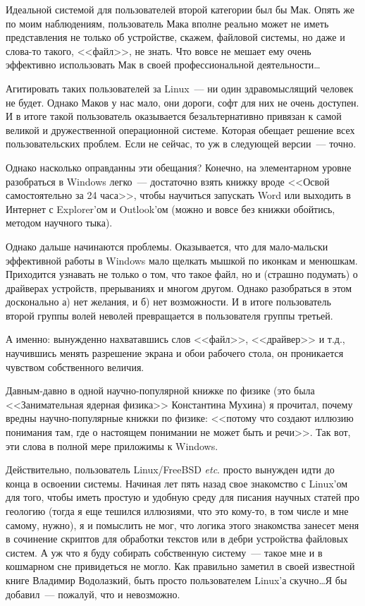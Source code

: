 Идеальной системой для пользователей второй категории был бы Мак. Опять же по моим наблюдениям, пользователь Мака вполне реально может не иметь представления не только об устройстве, скажем, файловой системы, но даже и слова-то такого, <<файл>>, не знать. Что вовсе не мешает ему очень эффективно использовать Мак в своей профессиональной деятельности\dots

Агитировать таких пользователей за Linux~--- ни один здравомыслящий человек не будет. Однако Маков у нас мало, они дороги, софт для них не очень доступен. И в итоге такой пользователь оказывается безальтернативно привязан к самой великой и дружественной операционной системе. Которая обещает решение всех пользовательских проблем. Если не сейчас, то уж в следующей версии~--- точно. 

Однако насколько оправданны эти обещания? Конечно, на элементарном уровне разобраться в Windows легко~--- достаточно взять книжку вроде <<Освой самостоятельно за 24 часа>>, чтобы научиться запускать Word или выходить в Интернет с Explorer'ом и Outlook'ом (можно и вовсе без книжки обойтись, методом научного тыка). 

Однако дальше начинаются проблемы. Оказывается, что для мало-мальски эффективной работы в Windows мало щелкать мышкой по иконкам и менюшкам. Приходится узнавать не только о том, что такое файл, но и (страшно подумать) о драйверах устройств, прерываниях и многом другом. Однако разобраться в этом досконально а) нет желания, и б) нет возможности. И в итоге пользователь второй группы волей неволей превращается в пользователя группы третьей.

А именно: вынужденно нахватавшись слов <<файл>>, <<драйвер>> и т.д., научившись менять разрешение экрана и обои рабочего стола, он проникается чувством собственного величия. 

Давным-давно в одной научно-популярной книжке по физике (это была <<Занимательная ядерная физика>> Константина Мухина) я прочитал, почему вредны научно-популярные книжки по физике: <<потому что создают иллюзию понимания там, где о настоящем понимании не может быть и речи>>. Так вот, эти слова в полной мере приложимы к Windows.

Действительно, пользователь Linux/FreeBSD \textit{etc}. просто вынужден идти до конца в освоении системы. Начиная лет пять назад свое знакомство с Linux'ом для того, чтобы иметь простую и удобную среду для писания научных статей про геологию (тогда я еще тешился иллюзиями, что это кому-то, в том числе и мне самому, нужно), я и помыслить не мог, что логика этого знакомства занесет меня в сочинение скриптов для обработки текстов или в дебри устройства файловых систем. А уж что я буду собирать собственную систему~--- такое мне и в кошмарном сне привидеться не могло. Как правильно заметил в своей известной книге Владимир Водолазкий, быть просто пользователем Linux'а скучно\dots Я бы добавил~--- пожалуй, что и невозможно. 

